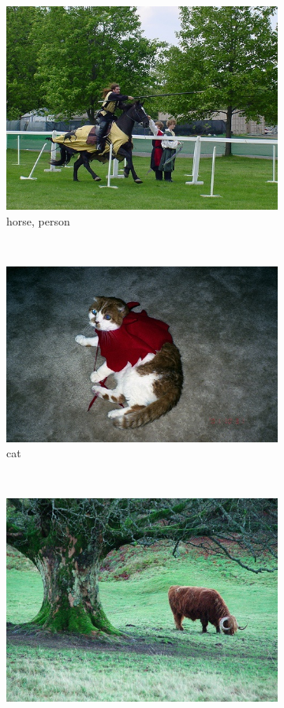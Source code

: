 \begin{figure}[bt]
\begin{subfigure}[b]{0.18\textwidth}
        \includegraphics[width=\textwidth]{000009}
        \caption{\scriptsize horse, person}
        \label{fig:voc5}
    \end{subfigure}
    ~
    \begin{subfigure}[b]{0.18\textwidth}
        \centering
        \includegraphics[width=\textwidth]{000011}
        \caption{\scriptsize cat}
        \label{fig:voc6}
    \end{subfigure}
    ~
    \begin{subfigure}[b]{0.18\textwidth}
        \centering
        \includegraphics[width=\textwidth]{000013}

\end{subfigure}
\end{figure}
